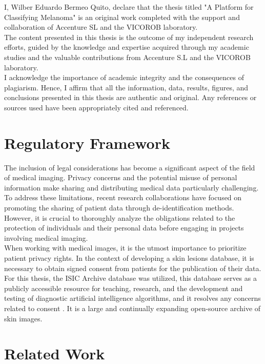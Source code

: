 I, Wilber Eduardo Bermeo Quito, declare that the thesis titled "A Platform for Classifying Melanoma" is an original work completed with the support and collaboration of Accenture SL and the VICOROB laboratory. \\

The content presented in this thesis is the outcome of my independent research efforts, guided by the knowledge and expertise acquired through my academic studies and the valuable contributions from Accenture S.L and the VICOROB laboratory. \\

I acknowledge the importance of academic integrity and the consequences of plagiarism. Hence, I affirm that all the information, data, results, figures, and conclusions presented in this thesis are authentic and original. Any references or sources used have been appropriately cited and referenced.

\section{Regulatory Framework}

The inclusion of legal considerations has become a significant aspect of the field of medical imaging. Privacy concerns and the potential misuse of personal information make sharing and distributing medical data particularly challenging. To address these limitations, recent research collaborations have focused on promoting the sharing of patient data through de-identification methods. However, it is crucial to thoroughly analyze the obligations related to the protection of individuals and their personal data before engaging in projects involving medical imaging. \\

When working with medical images, it is the utmost importance to prioritize patient privacy rights. In the context of developing a skin lesions database, it is necessary to obtain signed consent from patients for the publication of their data. For this thesis, the ISIC Archive database was utilized, this database serves as a publicly accessible resource for teaching, research, and the development and testing of diagnostic artificial intelligence algorithms, and it resolves any concerns related to consent \cite{IsicArchive}. It is a large and continually expanding open-source archive of skin images.

\section{Related Work}

